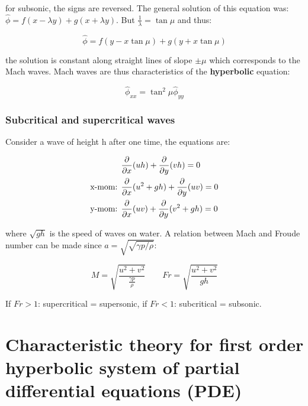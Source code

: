 	for subsonic, the signs are reversed. The general solution of this equation was: $\hat{\phi} = f(x-\lambda y) + g(x+\lambda y)$. But $\frac{1}{\lambda} = \tan \mu$ and thus: 
	
	\begin{equation}
	\hat{\phi} = f(y - x\tan \mu) + g(y + x \tan \mu)
	\end{equation}
	
	the solution is constant along straight lines of slope $\pm \mu$ which corresponds to the Mach waves. Mach waves are thus characteristics of the \textbf{hyperbolic} equation: 
	
	\begin{equation}
	\hat{\phi} _{xx} = \tan^2 \mu \hat{\phi} _{yy} 
	\end{equation}
	
\subsubsection{Subcritical and supercritical waves}
	Consider a wave of height h after one time, the equations are: 
	
	\begin{equation}
	\begin{aligned}
	&\frac{\D }{\D x} (uh) + \frac{\D}{\D y} (vh) = 0\\
	\mbox{x-mom: } &\frac{\D}{\D x } (u^2 + gh) + \frac{\D}{\D y} (uv) = 0\\
	\mbox{y-mom: } &\frac{\D}{\D x } (uv) + \frac{\D}{\D y} (v^2 + gh) = 0
	\end{aligned}
	\end{equation}
	
	where $\sqrt{gh}$ is the speed of waves on water. A relation between Mach and Froude number can be made since $a = \sqrt{\sqrt{\gamma p /\rho}}$: 
	
	\begin{equation}
	M = \sqrt{\frac{u^2 + v^2}{\frac{\gamma p}{\rho}}} \qquad Fr = \sqrt{\frac{u^2 + v^2}{gh}}
	\end{equation}
	
	If $Fr > 1$: supercritical = supersonic, if $Fr < 1$: subcritical = subsonic. 
	
\section{Characteristic theory for first order hyperbolic system of partial differential equations (PDE)}

